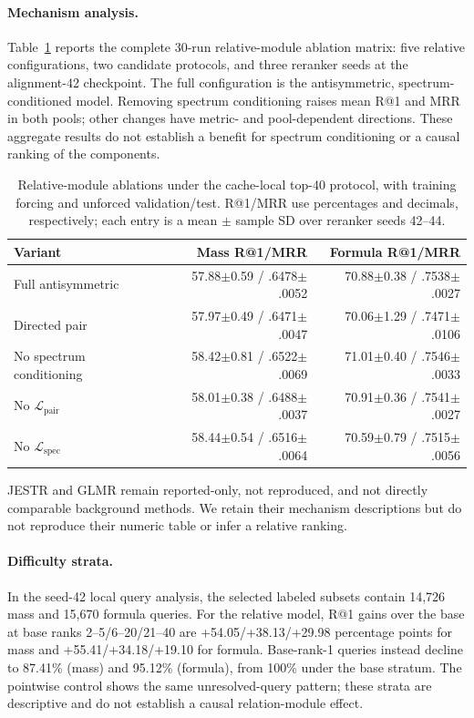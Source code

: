 \documentclass[runningheads]{llncs}
\begin{document}
\begin{sloppypar}
\paragraph{Mechanism analysis.}
Table~\ref{tab:relative_ablations} reports the complete 30-run relative-module
ablation matrix: five relative configurations, two candidate protocols, and
three reranker seeds at the alignment-42 checkpoint. The full configuration is
the antisymmetric, spectrum-conditioned model. Removing spectrum conditioning
raises mean R@1 and MRR in both pools; other changes have metric- and
pool-dependent directions. These aggregate results do not establish a benefit
for spectrum conditioning or a causal ranking of the components.
\end{sloppypar}

\begin{table}[t]
  \centering
  \caption{Relative-module ablations under the cache-local top-40 protocol,
  with training forcing and unforced validation/test. R@1/MRR use percentages
  and decimals, respectively; each
  entry is a mean $\pm$ sample SD over reranker seeds 42--44.}
  \label{tab:relative_ablations}
  \scriptsize
  \setlength{\tabcolsep}{2.5pt}
  \begin{tabular}{@{}lrr@{}}
    \toprule
    Variant & Mass R@1/MRR & Formula R@1/MRR \\
    \midrule
    Full antisymmetric & 57.88$\pm$0.59 / .6478$\pm$.0052 & 70.88$\pm$0.38 / .7538$\pm$.0027 \\
    Directed pair & 57.97$\pm$0.49 / .6471$\pm$.0047 & 70.06$\pm$1.29 / .7471$\pm$.0106 \\
    No spectrum conditioning & 58.42$\pm$0.81 / .6522$\pm$.0069 & 71.01$\pm$0.40 / .7546$\pm$.0033 \\
    No $\mathcal{L}_{\mathrm{pair}}$ & 58.01$\pm$0.38 / .6488$\pm$.0037 & 70.91$\pm$0.36 / .7541$\pm$.0027 \\
    No $\mathcal{L}_{\mathrm{spec}}$ & 58.44$\pm$0.54 / .6516$\pm$.0064 & 70.59$\pm$0.79 / .7515$\pm$.0056 \\
    \bottomrule
  \end{tabular}
\end{table}

JESTR and GLMR remain reported-only, not reproduced, and not directly
comparable background methods. We retain their mechanism descriptions but do
not reproduce their numeric table or infer a relative ranking.

\paragraph{Difficulty strata.}
In the seed-42 local query analysis, the selected labeled subsets contain
14,726 mass and 15,670 formula queries. For the relative model, R@1 gains over
the base at base ranks 2--5/6--20/21--40 are +54.05/+38.13/+29.98 percentage
points for mass and +55.41/+34.18/+19.10 for formula. Base-rank-1 queries
instead decline to 87.41\% (mass) and 95.12\% (formula), from 100\% under the
base stratum. The pointwise control shows the same unresolved-query pattern;
these strata are descriptive and do not establish a causal relation-module
effect.
\end{document}
